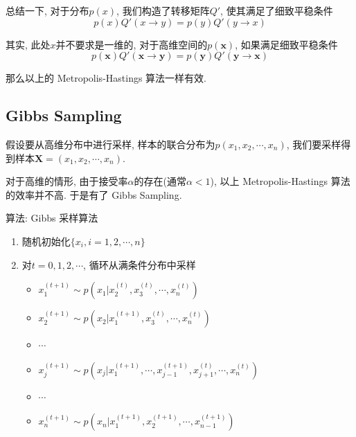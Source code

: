 \documentclass[a4paper,UTF8]{ctexart}
\theoremstyle{plain} \newtheorem{theorem}{定理}[section]
\theoremstyle{plain} \newtheorem{definition}{定义}[section]
\theoremstyle{plain} \newtheorem{lemma}{引理}[section]
\theoremstyle{plain} \newtheorem{proposition}{命题}[section]
\theoremstyle{plain} \newtheorem{example}{例}[section]
\theoremstyle{plain} \newtheorem{remark}{注}[section]
\theoremstyle{plain} \newtheorem{corollary}{推论}[section]
\begin{document}
总结一下, 对于分布$p(x)$, 我们构造了转移矩阵$Q'$, 使其满足了细致平稳条件
\begin{equation*}
p(x) Q'(x \rightarrow y) = p(y) Q'(y \rightarrow x)
\end{equation*}

其实, 此处$x$并不要求是一维的, 对于高维空间的$p(\bm{x})$, 如果满足细致平稳条件
\begin{equation*}
p(\bm{x}) Q'(\bm{x} \rightarrow \bm{y}) = p(\bm{y}) Q'(\bm{y} \rightarrow \bm{x})
\end{equation*}

那么以上的 Metropolis-Hastings 算法一样有效.


\subsection{Gibbs Sampling}
假设要从高维分布中进行采样, 样本的联合分布为$p(x_1, x_2, \cdots, x_n)$, 我们要采样得到样本$\bm{X} = (x_1, x_2, \cdots, x_n)$.

对于高维的情形, 由于接受率$\alpha$的存在(通常$\alpha < 1$), 以上 Metropolis-Hastings 算法的效率并不高. 于是有了 Gibbs Sampling.

\begin{algorithm}[htb]
\caption{算法: Gibbs 采样算法}

\begin{enumerate}[1.]
\item  随机初始化$\{ x_i, i = 1, 2, \cdots, n \}$

\item 对$t = 0, 1, 2, \cdots$, 循环从满条件分布中采样
\begin{itemize}
    \item $x_{1}^{(t+1)} \sim p(x_1 | x_{2}^{(t)}, x_{3}^{(t)}, \cdots, x_{n}^{(t)})$
    \item $x_{2}^{(t+1)} \sim p(x_2 | x_{1}^{(t+1)}, x_{3}^{(t)}, \cdots, x_{n}^{(t)})$
    \item $\cdots$
    \item $x_{j}^{(t+1)} \sim p(x_j | x_{1}^{(t+1)}, \cdots, x_{j-1}^{(t+1)}, x_{j+1}^{(t)} ,\cdots, x_{n}^{(t)})$
    \item $\cdots$    
    \item $x_{n}^{(t+1)} \sim p(x_n | x_{1}^{(t+1)}, x_{2}^{(t+1)}, \cdots, x_{n-1}^{(t+1)})$
\end{itemize}
\end{enumerate}

\end{algorithm}
\end{document}
